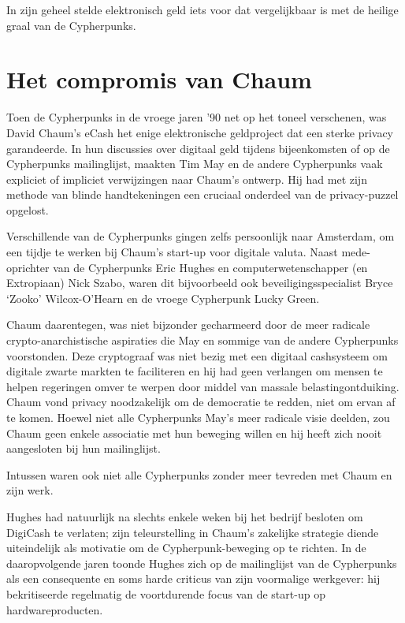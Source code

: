 \documentclass[smalldemyvopaper,11pt,twoside,onecolumn,openright,extrafontsizes,hidelinks]{memoir}
\begin{document}
In zijn geheel stelde elektronisch geld iets voor dat vergelijkbaar is
met de heilige graal van de Cypherpunks.

\section{Het compromis van Chaum}\label{het-compromis-van-chaum}

Toen de Cypherpunks in de vroege jaren '90 net op het toneel verschenen,
was David Chaum's eCash het enige elektronische geldproject dat een
sterke privacy garandeerde. In hun discussies over digitaal geld tijdens
bijeenkomsten of op de Cypherpunks mailinglijst, maakten Tim May en de
andere Cypherpunks vaak expliciet of impliciet verwijzingen naar Chaum's
ontwerp. Hij had met zijn methode van blinde handtekeningen een cruciaal
onderdeel van de privacy-puzzel opgelost.

Verschillende van de Cypherpunks gingen zelfs persoonlijk naar
Amsterdam, om een tijdje te werken bij Chaum's start-up voor digitale
valuta. Naast mede-oprichter van de Cypherpunks Eric Hughes en
computerwetenschapper (en Extropiaan) Nick Szabo, waren dit bijvoorbeeld
ook beveiligingsspecialist Bryce `Zooko' Wilcox-O'Hearn en de vroege
Cypherpunk Lucky Green.

Chaum daarentegen, was niet bijzonder gecharmeerd door de meer radicale
crypto-anarchistische aspiraties die May en sommige van de andere
Cypherpunks voorstonden. Deze cryptograaf was niet bezig met een
digitaal cashsysteem om digitale zwarte markten te faciliteren en hij
had geen verlangen om mensen te helpen regeringen omver te werpen door
middel van massale belastingontduiking. Chaum vond privacy noodzakelijk
om de democratie te redden, niet om ervan af te komen. Hoewel niet alle
Cypherpunks May's meer radicale visie deelden, zou Chaum geen enkele
associatie met hun beweging willen en hij heeft zich nooit aangesloten
bij hun mailinglijst.

Intussen waren ook niet alle Cypherpunks zonder meer tevreden met Chaum
en zijn werk.

Hughes had natuurlijk na slechts enkele weken bij het bedrijf besloten
om DigiCash te verlaten; zijn teleurstelling in Chaum's zakelijke
strategie diende uiteindelijk als motivatie om de Cypherpunk-beweging op
te richten. In de daaropvolgende jaren toonde Hughes zich op de
mailinglijst van de Cypherpunks als een consequente en soms harde
criticus van zijn voormalige werkgever: hij bekritiseerde regelmatig de
voortdurende focus van de start-up op hardwareproducten.
\end{document}

